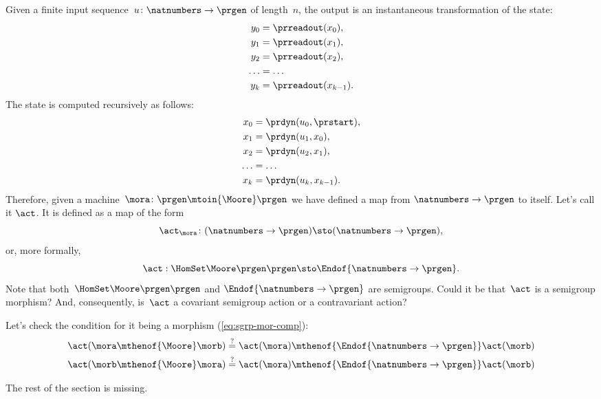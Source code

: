 Given a finite input sequence~$u\colon \natnumbers \to \prgen$ of length~$n$, the output is an instantaneous transformation of the state:
%
\begin{equation}
	\label{eq:actions-on-sequences-y}
	\begin{aligned}
		y_0   & = \prreadout(x_0),     \\
		y_1   & = \prreadout(x_1),     \\
		y_2   & = \prreadout(x_2),     \\
		\dots & = \dots                \\
		y_{k} & = \prreadout(x_{k-1}).
	\end{aligned}
\end{equation}
%
The state is computed recursively as follows:
\begin{equation}
	\label{eq:actions-on-sequences-x}
	\begin{aligned}
		x_0   & = \prdyn(u_0, \prstart),  \\
		x_1   & = \prdyn(u_1, x_0),       \\
		x_2   & = \prdyn(u_2, x_1),       \\
		\dots & = \dots                   \\
		x_{k} & = \prdyn(u_{k}, x_{k-1}).
	\end{aligned}
\end{equation}
%
Therefore, given a machine~$\mora \colon \prgen \mtoin{\Moore} \prgen$ we have defined a map from $\natnumbers \to \prgen$ to itself.
Let's call it $\act$.
It is defined as a map of the form
%
\begin{equation}
	\label{eq:actions-on-sequences-1}
	\act_{\mora}\colon  (\natnumbers \to \prgen)  \sto  (\natnumbers \to \prgen),
\end{equation}
%
or, more formally,
%
\begin{equation}
	\label{eq:actions-on-sequences-2}
	\act: \HomSet\Moore\prgen\prgen \sto \Endof {\natnumbers \to \prgen}.
\end{equation}
%
Note that both~$\HomSet\Moore\prgen\prgen$ and $\Endof {\natnumbers \to \prgen}$ are semigroups.
Could it be that~$\act$ is a semigroup morphism?
And, consequently, is~$\act$ a covariant semigroup action or a contravariant action?

Let's check the condition for it being a morphism (\cref{eq:sgrp-mor-comp}):
%
\begin{align}
	\act ( \mora \mthenof{\Moore} \morb) & \mathrel{\stackrel{?
	}{=} } \act ( \mora) \mthenof{\Endof  {\natnumbers \to \prgen}} \act(\morb) \label{eq:actions-on-sequences-left}                                                             \\
	\act ( \morb \mthenof{\Moore} \mora) & \mathrel{\stackrel{?}{=}}  \act ( \mora) \mthenof{\Endof  {\natnumbers \to \prgen}} \act(\morb) \label{eq:actions-on-sequences-right}
\end{align}
\begin{publictodo}
	The rest of the section is missing.
\end{publictodo}

